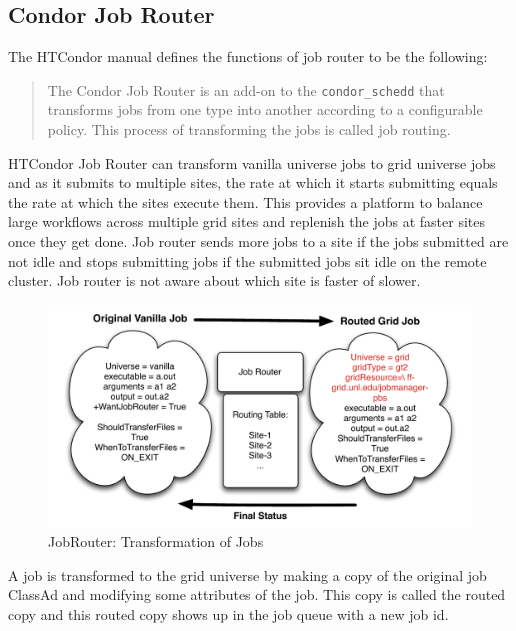 \documentclass[ms,electronic,double]{nuthesis}
\begin{document}
\subsection{Condor Job Router}

The HTCondor manual defines the functions of job router to be the following:
\begin{quotation}

The Condor Job Router is an add-on to the \texttt{condor\_schedd} that transforms jobs from one type into 
another according to a configurable policy\cite{manual56}. 
This process of transforming the jobs is called job routing.
\end{quotation}

HTCondor Job Router can transform vanilla universe jobs to grid universe jobs and 
as it submits to multiple sites, the rate at which it starts submitting equals 
the rate at which the sites execute them. This provides a platform to balance large 
workflows across multiple grid sites and replenish the jobs at
faster sites once they get done. Job router sends more jobs to a site if 
the jobs submitted are not idle and stops submitting jobs if the submitted jobs 
sit idle on the remote cluster. Job router is not aware about which site is 
faster of slower.


\begin{figure}[htbp!]
\begin{center}
\includegraphics[scale=0.75]{images/jobRouter}
\caption{JobRouter: Transformation of Jobs}
\label{fig:JobRouter}
\end{center}
\end{figure}

A job is transformed to the grid universe by making a copy of the original job 
ClassAd and modifying some attributes of the job. This copy is called the routed 
copy and this routed copy shows up in the job queue with a new job id\cite{manual56}.
\end{document}
